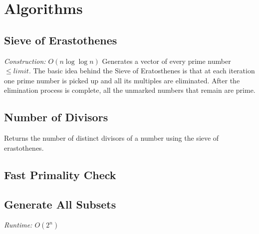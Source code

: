 \documentclass[../hackpack.tex]{subfiles}
\begin{document}
\section{Algorithms}

\subsection{Sieve of Erastothenes}
\textit{Construction: $O(n\log{\log{n}})$} 
\newline
Generates a vector of every prime number $\leq limit$. The basic idea behind the Sieve of Eratosthenes is that at each iteration one prime number is picked up and all its multiples are eliminated. 
After the elimination process is complete, all the unmarked numbers that remain are prime.


\subsection{Number of Divisors}
Returns the number of distinct divisors of a number using the sieve of erastothenes.


\subsection{Fast Primality Check}


\subsection{Generate All Subsets}
\textit{Runtime: $O(2^n)$} 

\end{document}
